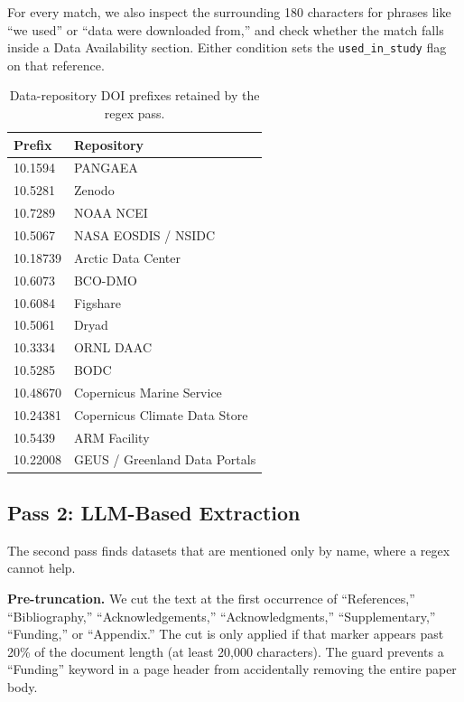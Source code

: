 \documentclass[sigconf]{acmart}
\begin{document}
For every match, we also inspect the surrounding 180 characters for phrases like
``we used'' or ``data were downloaded from,'' and check whether the match falls
inside a Data Availability section. Either condition sets the \texttt{used\_in\_study}
flag on that reference.

\begin{table}[t]
  \caption{Data-repository DOI prefixes retained by the regex pass.}
  \label{tab:doi}
  \small
  \setlength{\tabcolsep}{4pt}
  \begin{tabular}{ll}
    \toprule
    \textbf{Prefix} & \textbf{Repository} \\
    \midrule
    10.1594  & PANGAEA \\
    10.5281  & Zenodo \\
    10.7289  & NOAA NCEI \\
    10.5067  & NASA EOSDIS / NSIDC \\
    10.18739 & Arctic Data Center \\
    10.6073  & BCO-DMO \\
    10.6084  & Figshare \\
    10.5061  & Dryad \\
    10.3334  & ORNL DAAC \\
    10.5285  & BODC \\
    10.48670 & Copernicus Marine Service \\
    10.24381 & Copernicus Climate Data Store \\
    10.5439  & ARM Facility \\
    10.22008 & GEUS / Greenland Data Portals \\
    \bottomrule
  \end{tabular}
\end{table}

\subsection{Pass 2: LLM-Based Extraction}

The second pass finds datasets that are mentioned only by name, where a regex
cannot help.

\textbf{Pre-truncation.}
We cut the text at the first occurrence of ``References,'' ``Bibliography,''
``Acknowledgements,'' ``Acknowledgments,'' ``Supplementary,'' ``Funding,'' or
``Appendix.'' The cut is only applied if that marker appears past 20\% of the
document length (at least 20,000 characters). The guard prevents a
``Funding'' keyword in a page header from accidentally removing the entire paper
body.
\end{document}
